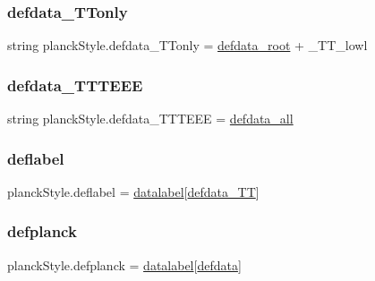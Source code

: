 \subsubsection{\texorpdfstring{defdata\+\_\+\+T\+Tonly}{defdata\_TTonly}}
{\footnotesize\ttfamily string planck\+Style.\+defdata\+\_\+\+T\+Tonly = \mbox{\hyperlink{namespaceplanckStyle_a0e660a6b993d079309a2b0f97276e0d3}{defdata\+\_\+root}} + \textquotesingle{}\+\_\+\+T\+T\+\_\+lowl\textquotesingle{}}

\mbox{\label{namespaceplanckStyle_ad2590e12fce49c44c1ff4b57348e652a}} 
\subsubsection{\texorpdfstring{defdata\+\_\+\+T\+T\+T\+E\+EE}{defdata\_TTTEEE}}
{\footnotesize\ttfamily string planck\+Style.\+defdata\+\_\+\+T\+T\+T\+E\+EE = \mbox{\hyperlink{namespaceplanckStyle_ac23576e1aafe24fd074f5450debf6f14}{defdata\+\_\+all}}}

\mbox{\label{namespaceplanckStyle_a2dabad242eac009ab5d210414f5eb38e}} 
\subsubsection{\texorpdfstring{deflabel}{deflabel}}
{\footnotesize\ttfamily planck\+Style.\+deflabel = \mbox{\hyperlink{namespaceplanckStyle_a8da1128119eb2cdd66bc98e4099d374c}{datalabel}}\mbox{[}\mbox{\hyperlink{namespaceplanckStyle_ae9a486070a1102293ca26bf924f115e2}{defdata\+\_\+\+TT}}\mbox{]}}

\mbox{\label{namespaceplanckStyle_a9b451fb33a16804c1322bae1300179c3}} 
\subsubsection{\texorpdfstring{defplanck}{defplanck}}
{\footnotesize\ttfamily planck\+Style.\+defplanck = \mbox{\hyperlink{namespaceplanckStyle_a8da1128119eb2cdd66bc98e4099d374c}{datalabel}}\mbox{[}\mbox{\hyperlink{namespaceplanckStyle_aea34dae3ec9210712a8386167c59f29c}{defdata}}\mbox{]}}

